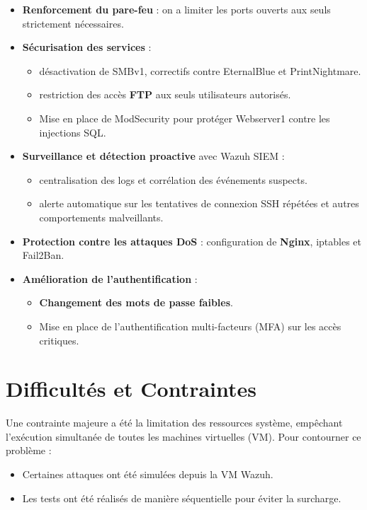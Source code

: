 \documentclass[a4paper,12pt]{report}
\begin{document}
\begin{itemize}
    \item \textbf{Renforcement du pare-feu} : on a limiter les ports ouverts aux seuls strictement nécessaires.
    \item \textbf{Sécurisation des services} :
    \begin{itemize}
        \item désactivation de SMBv1, correctifs contre EternalBlue et PrintNightmare.
        \item restriction des accès \textbf{FTP} aux seuls utilisateurs autorisés.
        \item Mise en place de ModSecurity pour protéger Webserver1 contre les injections SQL.
    \end{itemize}
    \item \textbf{Surveillance et détection proactive} avec Wazuh SIEM :
    \begin{itemize}
        \item centralisation des logs et corrélation des événements suspects.
        \item alerte automatique sur les tentatives de connexion SSH répétées et autres comportements malveillants.
    \end{itemize}
    \item \textbf{Protection contre les attaques DoS} : configuration de \textbf{Nginx}, iptables et Fail2Ban.
    \item \textbf{Amélioration de l’authentification} :
    \begin{itemize}
        \item \textbf{Changement des mots de passe faibles}.
        \item Mise en place de l’authentification multi-facteurs (MFA) sur les accès critiques.
    \end{itemize}
\end{itemize}

\section{Difficultés et Contraintes}

Une contrainte majeure a été la limitation des ressources système, empêchant l’exécution simultanée de toutes les machines virtuelles (VM). Pour contourner ce problème :
\begin{itemize}
    \item Certaines attaques ont été simulées depuis la VM Wazuh.
    \item Les tests ont été réalisés de manière séquentielle pour éviter la surcharge.
\end{itemize}
\end{document}

